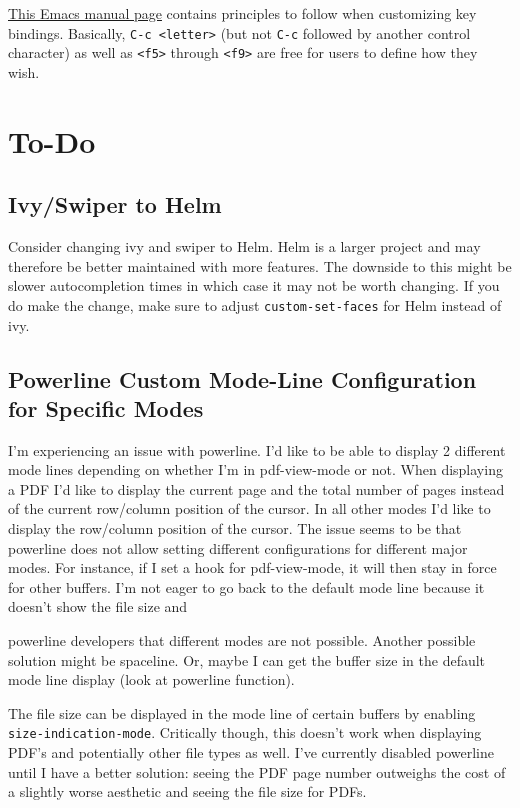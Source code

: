 \documentclass{default}
\begin{document}
\href{https://www.gnu.org/software/emacs/manual/html_node/elisp/Key-Binding-Conventions.html}{This
  Emacs manual page} contains principles to follow when customizing key bindings. Basically,
\texttt{C-c <letter>} (but not \texttt{C-c} followed by another control
character) as well as \texttt{<f5>} through \texttt{<f9>} are free for users to
define how they wish.


\chapter{To-Do}\label{cha:to-do}

\section{Ivy/Swiper to Helm}\label{sec:ivyswiper-helm}

Consider changing ivy and swiper to Helm. Helm is a larger project and may therefore be better
maintained with more features. The downside to this might be slower autocompletion times in which
case it may not be worth changing. If you do make the change, make sure to adjust
\lstinline{custom-set-faces} for Helm instead of ivy.


\section{Powerline Custom Mode-Line Configuration for Specific Modes}
\label{sec:powerl-cust-mode}

I'm experiencing an issue with powerline. I'd like to be able to display 2 different mode lines
depending on whether I'm in pdf-view-mode or not. When displaying a PDF I'd like to display the
current page and the total number of pages instead of the current row/column position of the
cursor. In all other modes I'd like to display the row/column position of the cursor. The issue
seems to be that powerline does not allow setting different configurations for different major
modes. For instance, if I set a hook for pdf-view-mode, it will then stay in force for other
buffers. I'm not eager to go back to the default mode line because it doesn't show the file size and

powerline developers that different modes are not possible. Another possible solution might be
spaceline. Or, maybe I can get the buffer size in the default mode line display (look at powerline
function).

The file size can be displayed in the mode line of certain buffers by enabling
\texttt{size-indication-mode}. Critically though, this doesn't work when displaying PDF's
and potentially other file types as well. I've currently disabled powerline until I have a better
solution: seeing the PDF page number outweighs the cost of a slightly worse aesthetic and seeing the
file size for PDFs.
\end{document}
